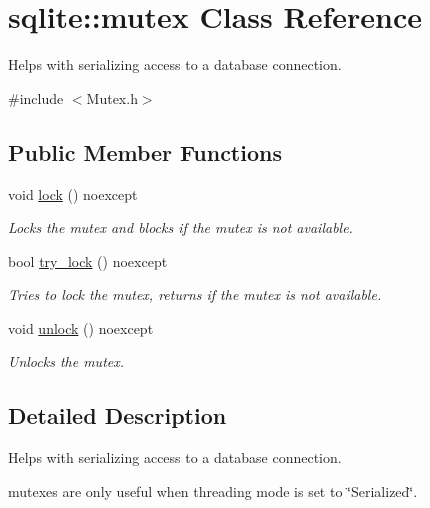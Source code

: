 \hypertarget{a00009}{\section{sqlite\-:\-:mutex Class Reference}
\label{a00009}
}


Helps with serializing access to a database connection.  




{\ttfamily \#include $<$Mutex.\-h$>$}

\subsection*{Public Member Functions}
\begin{DoxyCompactItemize}
\item 
\hypertarget{a00009_a6a793427100e67bfac37ea0286c5d2bb}{void \hyperlink{a00009_a6a793427100e67bfac37ea0286c5d2bb}{lock} () noexcept}\label{a00009_a6a793427100e67bfac37ea0286c5d2bb}

\begin{DoxyCompactList}\small\item\em Locks the mutex and blocks if the mutex is not available. \end{DoxyCompactList}\item 
bool \hyperlink{a00009_a8b02e4596fcbd79e2be5f0c1de9516c3}{try\-\_\-lock} () noexcept
\begin{DoxyCompactList}\small\item\em Tries to lock the mutex, returns if the mutex is not available. \end{DoxyCompactList}\item 
\hypertarget{a00009_a67937d9bd0193934404693dbef0b21f6}{void \hyperlink{a00009_a67937d9bd0193934404693dbef0b21f6}{unlock} () noexcept}\label{a00009_a67937d9bd0193934404693dbef0b21f6}

\begin{DoxyCompactList}\small\item\em Unlocks the mutex. \end{DoxyCompactList}\end{DoxyCompactItemize}


\subsection{Detailed Description}
Helps with serializing access to a database connection. 

mutexes are only useful when threading mode is set to \char`\"{}\-Serialized\char`\"{}.

